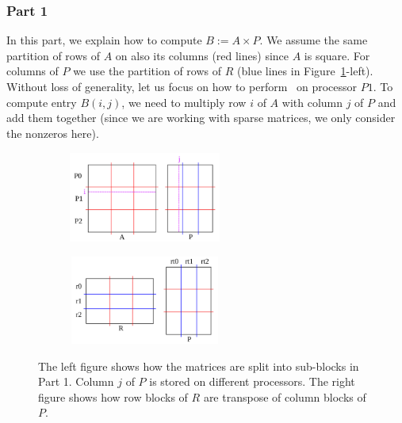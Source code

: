 \subsubsection{Part 1}

In this part, we explain how to compute $B := A \times P$. We assume the same partition of rows of $A$ on also its columns (red lines) since $A$ is square. For columns of $P$ we use the partition of rows of $R$ (blue lines in Figure~\ref{fig:part1b}-left).
Without loss of generality, let us focus on how to perform \mm ~on processor $P1$. To compute entry $B(i, j)$, we need to multiply row $i$ of $A$ with column $j$ of $P$ and add them together (since we are working with sparse matrices, we only consider the nonzeros here).

\begin{figure}[tbh]
    \centering
    \begin{subfigure}{.45\textwidth}
        \includegraphics[width=5cm,height=3cm]{./figures/part1b.pdf}
    \end{subfigure}
    \begin{subfigure}{.45\textwidth}
        \centering
        \includegraphics[width=5cm,height=2.9cm]{./figures/part1c.pdf}
    \end{subfigure}
    \caption{The left figure shows how the matrices are split into sub-blocks in Part 1. Column $j$ of $P$ is stored on different processors. The right figure shows how row blocks of $R$ are transpose of column blocks of $P$.}
    \label{fig:part1b}
\end{figure}

